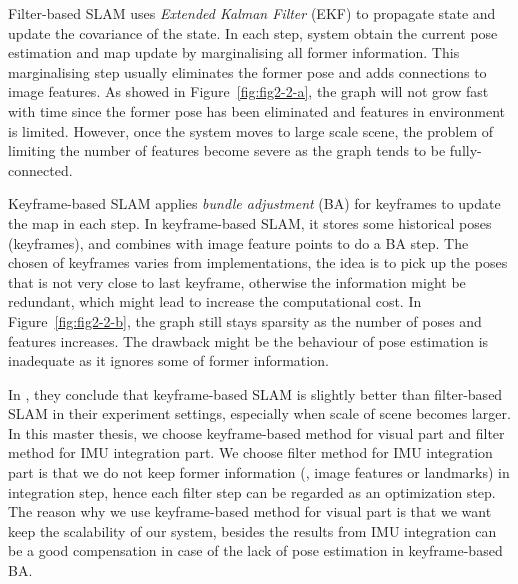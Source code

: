 Filter-based SLAM \cite{davison2007monoslam, eade2007monocular, davison2003real} uses \textit{Extended Kalman Filter} (EKF) to propagate state and update the covariance of the state. In each step, system obtain the current pose estimation and map update by marginalising all former information. This marginalising step usually eliminates the former pose and adds connections to image features. As showed in Figure~\ref{fig:fig2-2-a}, the graph will not grow fast with time since the former pose has been eliminated and features in environment is limited. However, once the system moves to large scale scene, the problem of limiting the number of features become severe as the graph tends to be fully-connected. 
   
Keyframe-based SLAM \cite{klein2007parallel, mourikis2007multi, forster2014svo, engel2014lsd, mur2015orb} applies \textit{bundle adjustment} (BA) for keyframes to update the map in each step. In keyframe-based SLAM, it stores some historical poses (keyframes), and combines with image feature points to do a BA step. The chosen of keyframes varies from implementations, the idea is to pick up the poses that is not very close to last keyframe, otherwise the information might be redundant, which might lead to increase the computational cost. In Figure~\ref{fig:fig2-2-b}, the graph still stays sparsity as the number of poses and features increases. The drawback might be the behaviour of pose estimation is inadequate as it ignores some of former information.

In \cite{strasdat2010real}, they conclude that keyframe-based SLAM is slightly better than filter-based SLAM in their experiment settings, especially when scale of scene becomes larger. In this master thesis, we choose keyframe-based method for visual part and filter method for IMU integration part. We choose filter method for IMU integration part is that we do not keep former information (\eg, image features or landmarks) in integration step, hence each filter step can be regarded as an optimization step. The reason why we use keyframe-based method for visual part is that we want keep the scalability of our system, besides the results from IMU integration can be a good compensation in case of the lack of pose estimation in keyframe-based BA.

